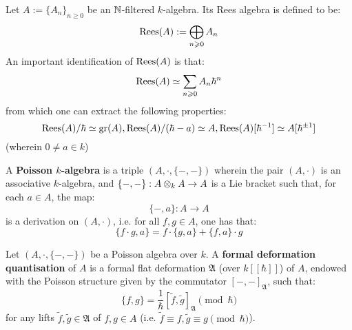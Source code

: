         \begin{example} \label{example: rees_algebras}
            Let $A := \{A_n\}_{n \geq 0}$ be an $\mathbb{N}$-filtered $k$-algebra. Its Rees algebra is defined to be:
                $$\operatorname{Rees}(A) := \bigoplus_{n \geqslant 0} A_n$$
            An important identification of $\operatorname{Rees}(A)$ is that:
                $$\operatorname{Rees}(A) \simeq \sum_{n \geqslant 0} A_n \hbar^n$$
            from which one can extract the following properties:
                $$\operatorname{Rees}(A)/\hbar \simeq \operatorname{gr}(A), \operatorname{Rees}(A)/(\hbar - a) \simeq A, \operatorname{Rees}(A)[\hbar^{-1}] \simeq A[\hbar^{\pm 1}]$$
            (wherein $0 \not = a \in k$)
        \end{example}
        
        \begin{definition} \label{def: poisson_algebras}
            A \textbf{Poisson $k$-algebra} is a triple $(A, \cdot, \{-, -\})$ wherein the pair $(A, \cdot)$ is an associative $k$-algebra, and $\{-, -\}: A \tensor_k A \to A$ is a Lie bracket such that, for each $a \in A$, the map:
                $$\{-, a\}: A \to A$$
            is a derivation on $(A, \cdot)$, i.e. for all $f, g \in A$, one has that:
                $$\{f \cdot g, a\} = f \cdot \{g, a\} + \{f, a\} \cdot g$$
        \end{definition}
        \begin{definition} \label{def: deformation_quantisation}
            Let $(A, \cdot, \{-, -\})$ be a Poisson algebra over $k$. A \textbf{formal deformation quantisation} of $A$ is a formal flat deformation $\mathfrak{A}$ (over $k[\![\hbar]\!]$) of $A$, endowed with the Poisson structure given by the commutator $[-, -]_{\mathfrak{A}}$, such that:
                $$\{f, g\} = \frac{1}{\hbar}[\tilde{f}, \tilde{g}]_{\mathfrak{A}} \pmod{\hbar}$$
            for any lifts $\tilde{f}, \tilde{g} \in \mathfrak{A}$ of $f, g \in A$ (i.e. $\tilde{f} \equiv f, \tilde{g} \equiv g \pmod{\hbar}$).
        \end{definition}

